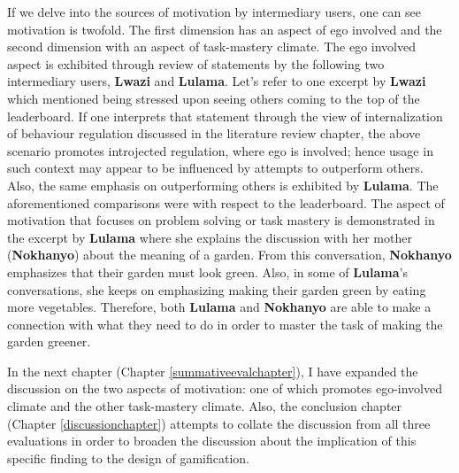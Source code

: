 If we delve into the sources of motivation by intermediary users, one can see motivation is twofold. The first dimension has an aspect of ego involved and the second dimension with an aspect of task-mastery climate. The ego involved aspect is exhibited through review of statements by the following two intermediary users, \textbf{Lwazi} and \textbf{Lulama}. Let's refer to one excerpt by \textbf{Lwazi} which mentioned being stressed upon seeing others coming to the top of the leaderboard. If one interprets that statement through the view of internalization of behaviour regulation discussed in the literature review chapter, the above scenario promotes introjected regulation, where ego is involved; hence usage in such context may appear to be influenced by attempts to outperform others. Also, the same emphasis on outperforming others is exhibited by \textbf{Lulama}. The aforementioned comparisons were with respect to the leaderboard. The aspect of motivation that focuses on problem solving or task mastery is demonstrated in the excerpt by \textbf{Lulama} where she explains the discussion with her mother (\textbf{Nokhanyo}) about the meaning of a garden. From this conversation, \textbf{Nokhanyo} emphasizes that their garden must look green. Also, in some of \textbf{Lulama}'s conversations, she keeps on emphasizing making their garden green by eating more vegetables. Therefore, both \textbf{Lulama} and \textbf{Nokhanyo} are able to make a connection with what they need to do in order to master the task of making the garden greener.

In the next chapter (Chapter \ref{summativeevalchapter}), I have expanded the discussion on the two aspects of motivation: one of which promotes ego-involved climate and the other task-mastery climate. Also, the conclusion chapter (Chapter \ref{discussionchapter}) attempts to collate the discussion from all three evaluations in order to broaden the discussion about the implication of this specific finding to the design of gamification.
 
\begin{flushright}
\end{flushright}
